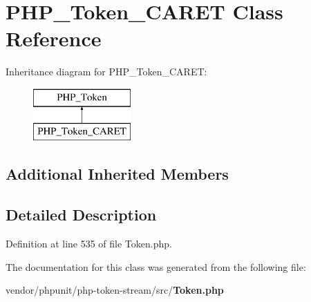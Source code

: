 \section{P\+H\+P\+\_\+\+Token\+\_\+\+C\+A\+R\+E\+T Class Reference}
\label{class_p_h_p___token___c_a_r_e_t}
Inheritance diagram for P\+H\+P\+\_\+\+Token\+\_\+\+C\+A\+R\+E\+T\+:\begin{figure}[H]
\begin{center}
\leavevmode
\includegraphics[height=2.000000cm]{class_p_h_p___token___c_a_r_e_t}
\end{center}
\end{figure}
\subsection*{Additional Inherited Members}


\subsection{Detailed Description}


Definition at line 535 of file Token.\+php.



The documentation for this class was generated from the following file\+:\begin{DoxyCompactItemize}
\item 
vendor/phpunit/php-\/token-\/stream/src/{\bf Token.\+php}\end{DoxyCompactItemize}
